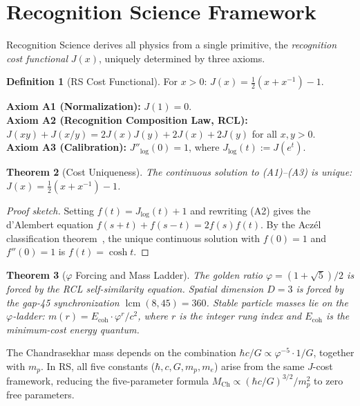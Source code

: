 \documentclass[12pt,a4paper]{article}
\newtheorem{theorem}{Theorem}[section]
\theoremstyle{definition}
\newtheorem{definition}[theorem]{Definition}
\theoremstyle{remark}
\begin{document}
\section{Recognition Science Framework}
\label{sec:framework}

Recognition Science derives all physics from a single primitive,
the \emph{recognition cost functional} $J(x)$, uniquely determined
by three axioms.

\begin{definition}[RS Cost Functional]
For $x > 0$: $J(x) = \tfrac{1}{2}(x + x^{-1}) - 1$.
\end{definition}

\noindent\textbf{Axiom A1 (Normalization):} $J(1) = 0$.\\
\textbf{Axiom A2 (Recognition Composition Law, RCL):}
$J(xy) + J(x/y) = 2J(x)J(y) + 2J(x) + 2J(y)$ for all $x, y > 0$.\\
\textbf{Axiom A3 (Calibration):} $J''_{\log}(0) = 1$, where
$J_{\log}(t) := J(e^t)$.

\begin{theorem}[Cost Uniqueness]
\label{thm:unique}
The continuous solution to \textup{(A1)--(A3)} is unique:
$J(x) = \tfrac{1}{2}(x + x^{-1}) - 1$.
\end{theorem}

\begin{proof}[Proof sketch]
Setting $f(t) = J_{\log}(t) + 1$ and rewriting \textup{(A2)} gives the
d'Alembert equation $f(s+t) + f(s-t) = 2f(s)f(t)$.  By the Acz\'el
classification theorem~\cite{Aczel1966}, the unique continuous solution
with $f(0) = 1$ and $f''(0) = 1$ is $f(t) = \cosh t$.
\end{proof}

\begin{theorem}[$\varphi$ Forcing and Mass Ladder]\label{thm:phi}
The golden ratio $\varphi = (1+\sqrt{5})/2$ is forced by the RCL
self-similarity equation.  Spatial dimension $D = 3$ is forced by
the gap-45 synchronization $\operatorname{lcm}(8,45) = 360$.  Stable
particle masses lie on the $\varphi$-ladder:
$m(r) = E_{\mathrm{coh}} \cdot \varphi^r / c^2$, where $r$ is the
integer rung index and $E_{\mathrm{coh}}$ is the minimum-cost energy quantum.
\end{theorem}

\noindent The Chandrasekhar mass depends on the combination
$\hbar c/G \propto \varphi^{-5} \cdot 1 / G$, together with $m_p$.
In RS, all five constants ($\hbar, c, G, m_p, m_e$) arise from the
same $J$-cost framework, reducing the five-parameter formula
$M_{\mathrm{Ch}} \propto (\hbar c/G)^{3/2}/m_p^2$ to zero free
parameters.
\end{document}
